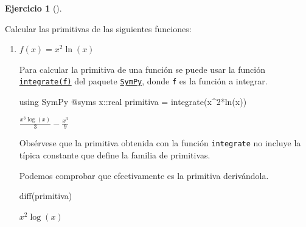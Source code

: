 \documentclass[
  a4paper,
]{scrreport}
\newenvironment{Shaded}{\begin{snugshade}}{\end{snugshade}}
\newcommand{\BuiltInTok}[1]{\textcolor[rgb]{0.00,0.23,0.31}{#1}}
\newcommand{\DataTypeTok}[1]{\textcolor[rgb]{0.68,0.00,0.00}{#1}}
\newcommand{\FloatTok}[1]{\textcolor[rgb]{0.68,0.00,0.00}{#1}}
\newcommand{\FunctionTok}[1]{\textcolor[rgb]{0.28,0.35,0.67}{#1}}
\newcommand{\ImportTok}[1]{\textcolor[rgb]{0.00,0.46,0.62}{#1}}
\newcommand{\NormalTok}[1]{\textcolor[rgb]{0.00,0.23,0.31}{#1}}
\newcommand{\OperatorTok}[1]{\textcolor[rgb]{0.37,0.37,0.37}{#1}}
\newcommand{\PreprocessorTok}[1]{\textcolor[rgb]{0.68,0.00,0.00}{#1}}
\theoremstyle{definition}
\newtheorem{exercise}{Ejercicio}[chapter]
\theoremstyle{remark}
\begin{document}
\begin{exercise}[]\protect\hypertarget{exr-primitivas}{}\label{exr-primitivas}

Calcular las primitivas de las siguientes funciones:

\begin{enumerate}
\def\labelenumi{\alph{enumi}.}
\item
  \(f(x)=x^2\ln(x)\)

  \begin{tcolorbox}[enhanced jigsaw, coltitle=black, colbacktitle=quarto-callout-tip-color!10!white, opacityback=0, colback=white, bottomrule=.15mm, titlerule=0mm, breakable, left=2mm, bottomtitle=1mm, title=\textcolor{quarto-callout-tip-color}{\faLightbulb}\hspace{0.5em}{Solución}, toptitle=1mm, opacitybacktitle=0.6, colframe=quarto-callout-tip-color-frame, rightrule=.15mm, arc=.35mm, toprule=.15mm, leftrule=.75mm]

  Para calcular la primitiva de una función se puede usar la función
  \href{https://docs.juliahub.com/SymPy/KzewI/1.0.31/Tutorial/calculus/\#Integrals-1}{\texttt{integrate(f)}}
  del paquete
  \href{https://docs.juliahub.com/SymPy/KzewI/1.0.31/}{\texttt{SymPy}},
  donde \texttt{f} es la función a integrar.

\begin{Shaded}
\begin{Highlighting}[]
\ImportTok{using} \BuiltInTok{SymPy}
\PreprocessorTok{@syms}\NormalTok{ x}\OperatorTok{::}\DataTypeTok{real}
\NormalTok{primitiva }\OperatorTok{=} \FunctionTok{integrate}\NormalTok{(x}\OperatorTok{\^{}}\FloatTok{2}\FunctionTok{*ln}\NormalTok{(x))}
\end{Highlighting}
\end{Shaded}

  $\frac{x^{3} \log{\left(x \right)}}{3} - \frac{x^{3}}{9}$

  Obsérvese que la primitiva obtenida con la función \texttt{integrate}
  no incluye la típica constante que define la familia de primitivas.

  Podemos comprobar que efectivamente es la primitiva derivándola.

\begin{Shaded}
\begin{Highlighting}[]
\FunctionTok{diff}\NormalTok{(primitiva)}
\end{Highlighting}
\end{Shaded}

  $x^{2} \log{\left(x \right)}$


\end{tcolorbox}
\end{enumerate}
\end{exercise}
\end{document}
